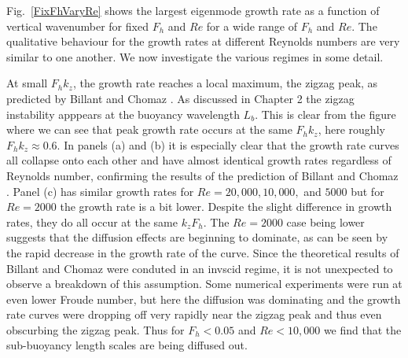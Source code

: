 Fig.~\ref{FixFhVaryRe} shows the largest eigenmode growth rate as a function of vertical wavenumber for fixed $F_{h}$ and $Re$ for a wide range of $F_{h}$ and $Re$. The qualitative behaviour for the growth rates at different Reynolds numbers are very similar to one another. We now investigate the various regimes in some detail.

At small $F_{h}k_{z}$, the growth rate reaches a local maximum, the zigzag peak, as predicted by Billant and Chomaz \cite{bc2000a,bc2000b,bc2000c}.  As discussed in Chapter 2 the zigzag instability apppears at the buoyancy wavelength $L_{b}$. This is clear from the figure where we can see that peak growth rate occurs at the same $F_{h}k_{z}$, here roughly $F_{h}k_{z}\approx 0.6$. In panels (a) and (b) it is especially clear that the growth rate curves all collapse onto each other and have almost identical growth rates regardless of Reynolds number, confirming the results of the prediction of Billant and Chomaz \cite{bc2000b,bc2000c}. Panel (c) has similar growth rates for $Re=20{,}000,10{,}000,$ and $5000$ but for $Re=2000$ the growth rate is a bit lower. Despite the slight difference in growth rates, they do all occur at the same $k_{z}F_{h}$. The $Re=2000$ case being lower suggests that the diffusion effects are beginning to dominate, as can be seen by the rapid decrease in the growth rate of the curve. Since the theoretical results of Billant and Chomaz \cite{bc2000b} were conduted in an invscid regime, it is not unexpected to observe a breakdown of this assumption. Some numerical experiments were run at even lower Froude number, but here the diffusion was dominating and the growth rate curves were dropping off very rapidly near the zigzag peak and thus even obscurbing the zigzag peak. Thus for $F_{h}<0.05$ and $Re<10{,}000$ we find that the sub-buoyancy length scales are being diffused out. 


